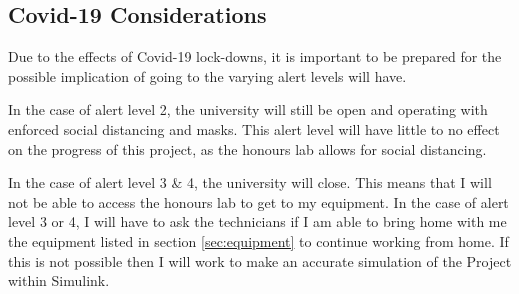 \documentclass[11pt, a4paper, twoside, openright]{report}
\begin{document}
\subsection{Covid-19 Considerations}

Due to the effects of Covid-19 lock-downs, it is important to be prepared for the possible implication of going to the varying alert levels will have.

In the case of alert level 2, the university will still be open and operating with enforced social distancing and masks. This alert level will have little to no effect on the progress of this project, as the honours lab allows for social distancing.

In the case of alert level 3 \& 4, the university will close. This means that I will not be able to access the honours lab to get to my equipment. In the case of alert level 3 or 4, I will have to ask the technicians if I am able to bring home with me the equipment listed in section \ref{sec:equipment} to continue working from home. If this is not possible then I will work to make an accurate simulation of the Project within Simulink.


\backmatter



\end{document}
